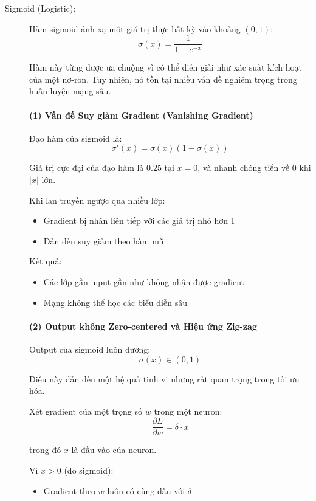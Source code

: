 \begin{description}
	\item[Sigmoid (Logistic):] Hàm sigmoid ánh xạ một giá trị thực bất kỳ vào khoảng $(0, 1)$:
	\begin{equation}
		\sigma(x) = \frac{1}{1 + e^{-x}}
	\end{equation}
	
	Hàm này từng được ưa chuộng vì có thể diễn giải như xác suất kích hoạt của một nơ-ron. Tuy nhiên, nó tồn tại nhiều vấn đề nghiêm trọng trong huấn luyện mạng sâu.
	
	\paragraph{(1) Vấn đề Suy giảm Gradient (Vanishing Gradient)}
	
	Đạo hàm của sigmoid là:
	\[
	\sigma'(x) = \sigma(x)(1 - \sigma(x))
	\]
	
	Giá trị cực đại của đạo hàm là $0.25$ tại $x=0$, và nhanh chóng tiến về 0 khi $|x|$ lớn.
	
	Khi lan truyền ngược qua nhiều lớp:
	\begin{itemize}
		\item Gradient bị nhân liên tiếp với các giá trị nhỏ hơn 1
		\item Dẫn đến suy giảm theo hàm mũ
	\end{itemize}
	
	Kết quả:
	\begin{itemize}
		\item Các lớp gần input gần như không nhận được gradient
		\item Mạng không thể học các biểu diễn sâu
	\end{itemize}
	
	\paragraph{(2) Output không Zero-centered và Hiệu ứng Zig-zag}
	
	Output của sigmoid luôn dương:
	\[
	\sigma(x) \in (0, 1)
	\]
	
	Điều này dẫn đến một hệ quả tinh vi nhưng rất quan trọng trong tối ưu hóa.
	
	Xét gradient của một trọng số $w$ trong một neuron:
	\[
	\frac{\partial L}{\partial w} = \delta \cdot x
	\]
	
	trong đó $x$ là đầu vào của neuron.
	
	Vì $x > 0$ (do sigmoid):
	\begin{itemize}
		\item Gradient theo $w$ luôn có cùng dấu với $\delta$
	\end{itemize}
	

\end{description}
